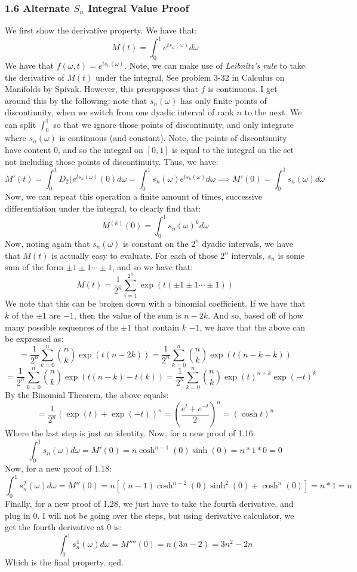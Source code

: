 \documentclass[12pt,a4paper]{article}
\newcommand{\1}[1]{\mathbbm{1}\left\{ #1 \right\}}
\begin{document}
\subsubsection{1.6 Alternate $S_n$ Integral Value Proof} We first show the derivative property. We have that:
$$
	M(t) = \int_0^1 e^{ts_n(\omega)} d\omega
$$
We have that $f(\omega,t) = e^{ts_n(\omega)}$. Note, we can make use of \textit{Leibnitz's rule} to take the derivative of $M(t)$ under the integral. See problem 3-32 in Calculus on Manifolds by Spivak. However, this presupposes that $f$ is continuous. I get around this by the following: note that $s_n(\omega)$ has only finite points of discontinuity, when we switch from one dyadic interval of rank $n$ to the next. We can split $\int_0^1$ so that we ignore those points of discontinuity, and only integrate where $s_n(\omega)$ is continuous (and constant). Note, the points of discontinuity have content $0$, and so the integral on $[0,1]$ is equal to the integral on the set not including those points of discontinuity. Thus, we have:
$$
	M'(t) = \int_0^1 D_2(e^{ts_n(\omega)}(0) d\omega =
	\int_0^1 s_n(\omega) e^{t s_n(\omega)} d\omega \implies
	M'(0) = \int_0^1 s_n(\omega) d\omega
$$
Now, we can repeat this operation a finite amount of times, successive differentiation under the integral, to clearly find that:
$$
	M^{(k)}(0) = \int_0^1 s_n(\omega)^k d\omega
$$
Now, noting again that $s_n(\omega)$ is constant on the $2^n$ dyadic intervals, we have that $M(t)$ is actually easy to evaluate. For each of those $2^n$ intervals, $s_n$ is some sum of the form $\pm 1 \pm 1 \cdots \pm 1$, and so we have that:
$$
	M(t) = \frac{1}{2^n} \sum_{i=1}^{2^n} \exp\left(t \left(\pm 1 \pm 1 \cdots \pm 1\right)\right)
$$
We note that this can be broken down with a binomial coefficient. If we have that $k$ of the $\pm 1$ are $-1$, then the value of the sum is $n - 2k$. And so, based off of how many possible sequences of the $\pm 1$ that contain $k$ $-1$, we have that the above can be expressed as:
$$
	= \frac{1}{2^n} \sum_{k=0}^n {n \choose k} \exp(t(n - 2k)) 
	= \frac{1}{2^n} \sum_{k=0}^n {n \choose k} \exp(t(n - k - k))
$$
$$
	= \frac{1}{2^n} \sum_{k=0}^n {n \choose k} \exp(t(n-k) - t(k))
	= \frac{1}{2^n} \sum_{k=0}^n {n \choose k} \exp(t)^{n-k}\exp(-t)^{k}
$$
By the Binomial Theorem, the above equals:
$$
	= \frac{1}{2^n}\left(\exp(t) + \exp(-t)\right)^n = \left(\frac{e^t + e^{-t}}{2}\right)^n =
	\left(\cosh t\right)^n
$$
Where the last step is just an identity. Now, for a new proof of 1.16:
$$
	\int_0^1 s_n(\omega) d\omega = M'(0) = n \cosh^{n-1}(0)\sinh(0) = n * 1 * 0 = 0
$$
Now, for a new proof of 1.18:
$$
	\int_0^1 s_n^2(\omega) d\omega = M''(0) = n \left[(n-1)\cosh^{n-2}(0)\sinh^2(0) + \cosh^n(0)\right] = n * 1 = n
$$
Finally, for a new proof of 1.28, we just have to take the fourth derivative, and plug in 0. I will not be going over the steps, but using derivative calculator, we get the fourth derivative at $0$ is:
$$
	\int_0^1 s_n^4(\omega) d\omega = M''''(0) = n \left(3n - 2\right) = 3n^2 - 2n
$$
Which is the final property. qed.
\end{document}
